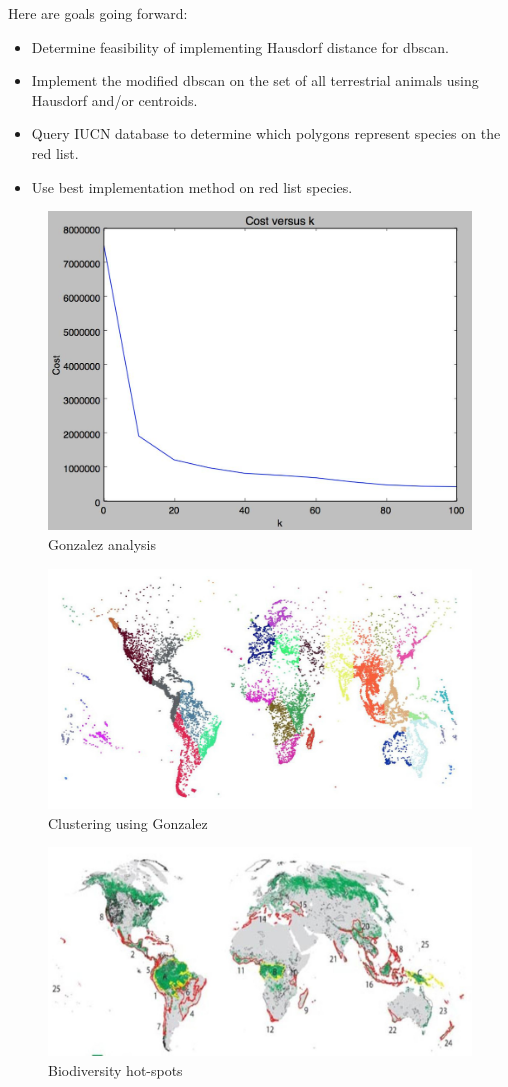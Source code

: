 \documentclass[12pt, fullpage,letterpaper]{article}
\begin{document}
	Here are goals going forward:
	\begin{itemize}
	\item Determine feasibility of implementing Hausdorf distance for dbscan.
	
	\item Implement the modified dbscan on the set of all terrestrial animals using Hausdorf and/or centroids.
	
	\item Query IUCN database to determine which polygons represent species on the red list.
	
	\item Use best implementation method on red list species.
	\end{itemize}
	
	\pagebreak
	
	\begin{figure}[h]
		\includegraphics[width=.4\textwidth]{fig1.jpg}
		\caption{Gonzalez analysis}
	\end{figure}
	\begin{figure}[h]
		\includegraphics[width=\textwidth]{fig2.jpg}
		\caption{Clustering using Gonzalez}
	\end{figure}
	
	\begin{figure}[h]
		\includegraphics[width=\textwidth]{fig3.jpg}
		\caption{Biodiversity hot-spots}
	\end{figure}
	
\end{document}

